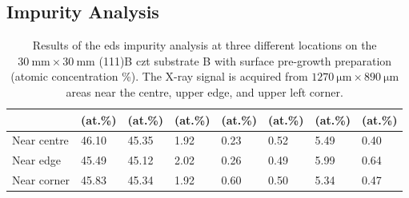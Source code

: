 
\subsection{Impurity Analysis}


\begin{table}[htbp]
    \centering
    \caption[\Ac{eds} impurity analysis of substrate B with surface pre-growth preparation.]{Results of the \ac{eds} impurity analysis at three different locations on the $\SI{30}{\milli\metre}\times\SI{30}{\milli\metre}$ (111)B \ac{czt} substrate B with surface pre-growth preparation (atomic concentration \%). The X-ray signal is acquired from $\SI{1270}{\micro\metre}\times\SI{890}{\micro\metre}$ areas near the centre, upper edge, and upper left corner.}\label{tab:subBb_eds_analysis}
    \begin{tabu} to 1.0\textwidth { X[1.85,r] X[1.125,c] X[1.125,c] X[1.125,c] X[1.125,c] X[1.125,c] X[1.125,c] X[1.125,c] }
    \hline
         & \textbf{} (at.\%) & \textbf{} (at.\%) & \textbf{} (at.\%) & \textbf{ } (at.\%) & \textbf{} (at.\%) & \textbf{} (at.\%) & \textbf{} (at.\%) \\
        \hline
        Near centre  & \SI{46.10}{} & \SI{45.35}{} & \SI{1.92}{} & \SI{0.23}{} & \SI{0.52}{} & \SI{5.49}{} & \SI{0.40}{} \\ %
        Near edge & \SI{45.49}{} & \SI{45.12}{} & \SI{2.02}{} & \SI{0.26}{} & \SI{0.49}{} & \SI{5.99}{} & \SI{0.64}{} \\ %
        Near corner & \SI{45.83}{} & \SI{45.34}{} & \SI{1.92}{} & \SI{0.60}{} & \SI{0.50}{} & \SI{5.34}{} & \SI{0.47}{} \\ %
         \hline
    \end{tabu}
\end{table}


